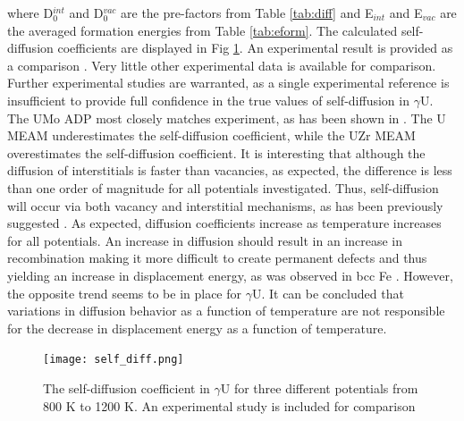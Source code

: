 \documentclass[review]{elsarticle}
\begin{document}
where D$^{int}_{0}$ and D$^{vac}_{0}$ are the pre-factors from Table \ref{tab:diff} and E$_{int}$ and E$_{vac}$ are the averaged formation energies from Table \ref{tab:eform}. The calculated self-diffusion coefficients are displayed in Fig \ref{fig:gamUdiff}. An experimental result is provided as a comparison \cite{adda1959}. Very little other experimental data is available for comparison. Further experimental studies are warranted, as a single experimental reference is insufficient to provide full confidence in the true values of self-diffusion in $\gamma$U. The UMo ADP most closely matches experiment, as has been shown in \cite{smirnovaADP}. The U MEAM underestimates the self-diffusion coefficient, while the UZr MEAM overestimates the self-diffusion coefficient. It is interesting that although the diffusion of interstitials is faster than vacancies, as expected, the difference is less than one order of magnitude for all potentials investigated. Thus, self-diffusion will occur via both vacancy and interstitial mechanisms, as has been previously suggested \cite{fedorov1978, smirnov1992}. As expected, diffusion coefficients increase as temperature increases for all potentials. An increase in diffusion should result in an increase in recombination making it more difficult to create permanent defects and thus yielding an increase in displacement energy, as was observed in bcc Fe \cite{beeler2016}. However, the opposite trend seems to be in place for $\gamma$U. It can be concluded that variations in diffusion behavior as a function of temperature are not responsible for the decrease in displacement energy as a function of temperature.

\begin{figure}[h]
 \centering
 \texttt{[image: self\_diff.png]} 
 \caption{The self-diffusion coefficient in $\gamma$U for three different potentials from 800 K to 1200 K. An experimental study is included for comparison \cite{adda1959}}
 \label{fig:gamUdiff}
\end{figure}

\FloatBarrier
\end{document}
